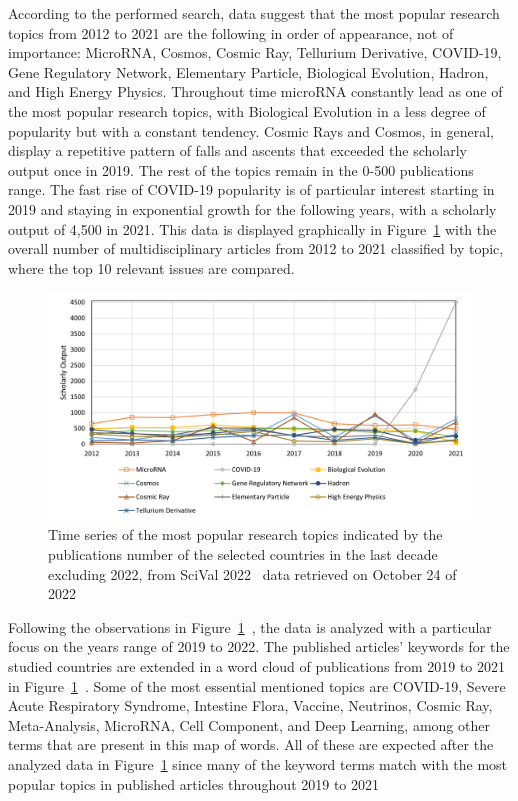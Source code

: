 \documentclass[conference]{IEEEtran}
\begin{document}
According to the performed search, data suggest that the most popular research topics from 2012 to 2021 are the following in order of appearance, not of importance: MicroRNA, Cosmos, Cosmic Ray, Tellurium Derivative, COVID-19, Gene Regulatory Network, Elementary Particle, Biological Evolution, Hadron, and High Energy Physics. Throughout time microRNA constantly lead as one of the most popular research topics, with Biological Evolution in a less degree of popularity but with a constant tendency. Cosmic Rays and Cosmos, in general, display a repetitive pattern of falls and ascents that exceeded the scholarly output once in 2019. The rest of the topics remain in the 0-500 publications range. The fast rise of COVID-19 popularity is of particular interest starting in 2019 and staying in exponential growth for the following years, with a scholarly output of 4,500 in 2021. This data is displayed graphically in Figure~\ref{fig:Multi2} with the overall number of multidisciplinary articles from 2012 to 2021 classified by topic, where the top 10 relevant issues are compared.

\begin{figure}[H]
    \centering
    \includegraphics[width = 9 cm]{Multi2.png}
    \caption{Time series of the most popular research topics indicated by the publications number of the selected countries in the last decade excluding 2022, from SciVal 2022~\cite{Scival2022} data retrieved on October 24 of 2022}
    \label{fig:Multi2}
\end{figure}

Following the observations in Figure~\ref{fig:Multi2}~\cite{Scival2022}, the data is analyzed with a particular focus on the years range of 2019 to 2022. The published articles' keywords for the studied countries are extended in a word cloud of publications from 2019 to 2021 in Figure~\ref{fig:Multi2}~\cite{Scival2022}. Some of the most essential mentioned topics are COVID-19, Severe Acute Respiratory Syndrome, Intestine Flora, Vaccine, Neutrinos, Cosmic Ray, Meta-Analysis, MicroRNA, Cell Component, and Deep Learning, among other terms that are present in this map of words. All of these are expected after the analyzed data in Figure~\ref{fig:Multi2} since many of the keyword terms match with the most popular topics in published articles throughout 2019 to 2021
\end{document}
